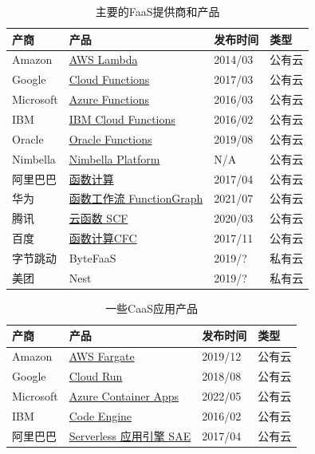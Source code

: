 \begin{table}[ht]
\centering
\begin{tabularx}{\textwidth}{|l|l|l|X|}
\toprule
\textbf{产商} & \textbf{产品} & \textbf{发布时间} & \textbf{类型} \\
\midrule
Amazon & \href{https://aws.amazon.com/cn/lambda/}{AWS Lambda} & 2014/03  &公有云 \\
\hline
Google & \href{https://cloud.google.com/functions}{Cloud Functions}& 2017/03 &公有云 \\
\hline
Microsoft & \href{https://azure.microsoft.com/en-us/products/functions/}{Azure Functions} & 2016/03 &公有云\\
\hline
IBM & \href{https://cloud.ibm.com/functions}{IBM Cloud Functions} &2016/02 &公有云\\
\hline
Oracle & \href{https://www.oracle.com/hk/cloud/cloud-native/functions/}{Oracle Functions} & 2019/08   &公有云\\
\hline
Nimbella & \href{https://nimbella.com/platform}{Nimbella Platform} & N/A  &公有云\\
\hline
阿里巴巴 & \href{https://www.alibabacloud.com/zh/product/function-compute}{函数计算}& 2017/04  &公有云\\
\hline
华为 &\href{https://www.huaweicloud.com/product/functiongraph.html}{函数工作流 FunctionGraph}& 2021/07   &公有云 \\
\hline
腾讯 & \href{https://cloud.tencent.com/product/scf}{云函数 SCF}& 2020/03  & 公有云 \\
\hline
百度 & \href{https://cloud.baidu.com/product/cfc.html}{函数计算CFC} & 2017/11 &公有云 \\
\hline
字节跳动 & ByteFaaS & 2019/? &私有云 \\
\hline
美团 & Nest & 2019/? &私有云 \\
\bottomrule
\end{tabularx}

\caption{主要的FaaS提供商和产品}
\label{table:serverless-faas-venders}
\end{table}


\begin{table}[ht]
\centering
\begin{tabularx}{\textwidth}{|l|l|l|X|}
\toprule
\textbf{产商} & \textbf{产品} & \textbf{发布时间} & \textbf{类型} \\
\midrule
Amazon & 
\href{https://aws.amazon.com/cn/fargate/}{AWS Fargate}& 2019/12 &公有云 \\
\hline
Google & 
\href{https://cloud.google.com/run}{Cloud Run}& 2018/08 &公有云 \\
\hline
Microsoft & 
\href{https://azure.microsoft.com/en-us/products/container-apps/}{Azure Container Apps}& 2022/05 &公有云 \\
\hline
IBM & \href{https://www.ibm.com/cloud/code-engine}{Code Engine} &2016/02 &公有云\\
\hline
阿里巴巴 & \href{https://www.aliyun.com/product/sae}{Serverless 应用引擎 SAE}& 2017/04  &公有云\\
\bottomrule
\end{tabularx}

\caption{一些CaaS应用产品}
\label{table:serverless-caas-venders}
\end{table}

